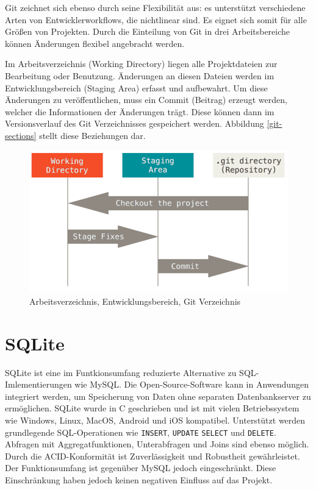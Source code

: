 Git zeichnet sich ebenso durch seine Flexibilität aus: es unterstützt verschiedene Arten von Entwicklerworkflows, die nichtlinear sind. 
Es eignet sich somit für alle Größen von Projekten.\cite{git}
Durch die Einteilung von Git in drei Arbeitsbereiche können Änderungen flexibel angebracht werden.

Im Arbeitsverzeichnis (Working Directory) liegen alle Projektdateien zur Bearbeitung oder Benutzung.
Änderungen an diesen Dateien werden im Entwicklungsbereich (Staging Area) erfasst und aufbewahrt.
Um diese Änderungen zu veröffentlichen, muss ein Commit (Beitrag) erzeugt werden, welcher die Informationen der Änderungen trägt.
Diese können dann im Versionsverlauf des Git Verzeichnisses gespeichert werden. Abbildung \vref{git-sections} stellt diese Beziehungen dar.

\begin{figure}[ht]
	\centering
	\includegraphics[width=0.8\linewidth]{git-sections.png}
	\caption{Arbeitsverzeichnis, Entwicklungsbereich, Git Verzeichnis}
	\label{git-sections}
\end{figure}

\section{SQLite}
SQLite ist eine im Funtkionsumfang reduzierte Alternative zu SQL-Imlementierungen wie MySQL.
Die Open-Source-Software kann in Anwendungen integriert werden, um Speicherung von Daten ohne separaten Datenbankserver zu ermöglichen. 
SQLite wurde in C geschrieben und ist mit vielen Betriebssystem wie Windows, Linux, MacOS, Android und iOS kompatibel. 
Unterstützt werden grundlegende SQL-Operationen wie \texttt{INSERT}, \texttt{UPDATE} \texttt{SELECT} und \texttt{DELETE}. 
Abfragen mit Aggregatfunktionen, Unterabfragen und Joins sind ebenso möglich. 
Durch die ACID-Konformität ist Zuverlässigkeit und Robustheit gewährleistet. 
Der Funktionsumfang ist gegenüber MySQL jedoch eingeschränkt. 
Diese Einschränkung haben jedoch keinen negativen Einfluss auf das Projekt.

